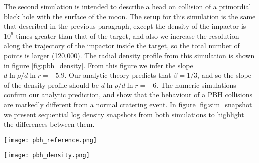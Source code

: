 \documentclass[usenatbib]{mnras}
\begin{document}
The second simulation is intended to describe a head on collision of a primordial black hole with the surface of the moon. The setup for this simulation is the same that described in the previous paragraph, except the density of the impactor is $10^6$ times greater than that of the target, and also we increase the resolution along the trajectory of the impactor inside the target, so the total number of points is larger (120,000). The radial density profile from this simulation is shown in figure \ref{fig:pbh_density}. From this figure we infer the slope $d \ln \rho / d \ln r = -5.9$. Our analytic theory predicts that $\beta = 1/3$, and so the slope of the density profile should be $d \ln \rho / d \ln r = -6$. The numeric simulations confirm our analytic prediction, and show that the behaviour of a PBH collisions are markedly different from a normal cratering event. In figure \ref{fig:sim_snapshot} we present sequential log density snapshots from both simulations to highlight the differences between them.

\begin{figure*}
    \centering
    \texttt{[image: pbh\_reference.png]}
    \caption{Radial density profile for a normal cratering event, obtained from numerical simulations. The radius is given in units of the impactor radius, and the density in units of impactor (and target) density. The slope of the power law fit is -4.1, whereas the analytic prediction is -4.5.}
    \label{fig:reference_pbh}
\end{figure*}

\begin{figure*}
    \centering
    \texttt{[image: pbh\_density.png]}
    \caption{Radial density profile for a head on PBH collision, obtained from numerical simulations. The radius is given in units of the impactor radius, and the density in units of impactor (and target) density. The slope of the power law fit is -5.9, whereas the analytic prediction is -6. The numerical simulation confirms the analytic prediction.}
    \label{fig:pbh_density}
\end{figure*}
\end{document}
